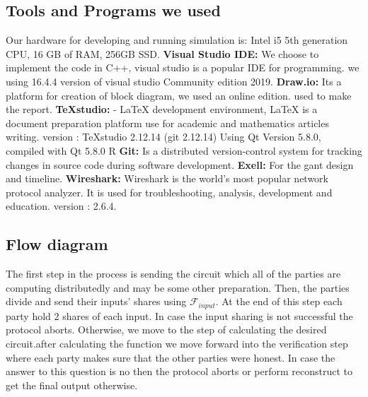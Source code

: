 \documentclass[12pt]{article}
\begin{document}
\subsection{Tools and Programs we used}
Our hardware for developing and running simulation is: \hfill\break
Intel i5 5th generation CPU, 16 GB of RAM, 256GB SSD. \hfill\break \hfill\break
\textbf{Visual Studio IDE:} We choose to implement the code in C++, visual studio is a popular IDE for programming. we using 16.4.4 version of visual studio Community edition 2019.
\hfill\break \hfill\break
\textbf{Draw.io:} Its a platform for creation of block diagram, we used an online edition. used to make the report. 
\hfill\break \hfill\break
\textbf{TeXstudio:} - LaTeX development environment, LaTeX is a document preparation platform use for academic and mathematics articles writing. version : TeXstudio 2.12.14 (git 2.12.14)
Using Qt Version 5.8.0, compiled with Qt 5.8.0 R
\hfill\break
\hfill\break
\textbf{Git:} Is a distributed version-control system for tracking changes in source code during software development.
\hfill\break
\hfill\break
\textbf{Exell:} For the gant design and timeline.
\hfill\break
\hfill\break
\textbf{Wireshark:} Wireshark is the world’s most popular network protocol analyzer. It is used for troubleshooting, analysis, development and education. version : 2.6.4.


\pagebreak
\subsection{Flow diagram}
The first step in the process is sending the circuit which all of the parties are computing distributedly and may be some other preparation. Then, the parties divide and send their inputs’ shares using $\mathcal{F}_{input}$. At the end of this step each party hold 2 shares of each input. In case the input sharing is not successful the protocol aborts. Otherwise, we move to the step of calculating the desired circuit.after calculating the function we move forward into the verification step where each party makes sure that the other parties were honest. In case the answer to this question is no then the protocol aborts or perform reconstruct to get the final output otherwise.
\end{document}
